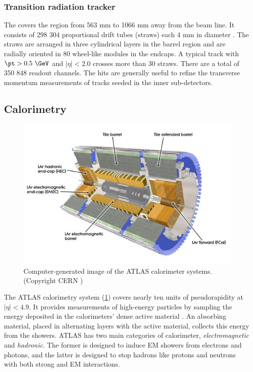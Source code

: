 \subsubsection{Transition radiation tracker}

The \trt covers the region from 563 mm to 1066 mm away from the beam line.
It consists of 298 304 proportional drift tubes (straws) each 4 mm in diameter \cite{Abat:2008zza}.
The straws are arranged in three cylindrical layers in the barrel region and are radially oriented in 80 wheel-like modules in the endcaps.
A typical track with $\pt > 0.5~\GeV$ and $|\eta| < 2.0$ crosses more than 30 straws.
There are a total of 350 848 readout channels.
The \trt hits are generally useful to refine the transverse momentum measurements of tracks seeded in the inner sub-detectors.

\subsection{Calorimetry}
\label{sec:atlas:calo}

\begin{figure}[t]
\includegraphics{calorimeter.jpg}
\caption{Computer-generated image of the ATLAS calorimeter systems. (Copyright CERN \cite{Pequenao:1095927})}
\label{fig:atlas_calorimeter}
\end{figure}

The ATLAS calorimetry system (\cref{fig:atlas_calorimeter}) covers nearly ten units of pseudorapidity at $|\eta| < 4.9$.
It provides measurements of high-energy particles by sampling the energy deposited in the calorimeters' dense active material \cite{Airapetian:1996iv}. %
An absorbing material, placed in alternating layers with the active material, collects this energy from the showers.
ATLAS has two main categories of calorimeter, \emph{electromagnetic} and \emph{hadronic}.
The former is designed to induce \ac{EM} showers from electrons and photons, and the latter is designed to stop hadrons like protons and neutrons with both strong and \ac{EM} interactions.

